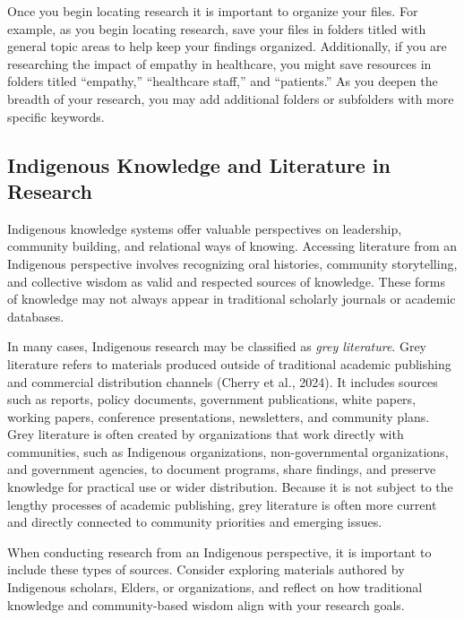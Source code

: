 \documentclass[
  letterpaper,
  DIV=11,
  numbers=noendperiod]{scrreprt}
\begin{document}
Once you begin locating research it is important to organize your files.
For example, as you begin locating research, save your files in folders
titled with general topic areas to help keep your findings organized.
Additionally, if you are researching the impact of empathy in
healthcare, you might save resources in folders titled ``empathy,''
``healthcare staff,'' and ``patients.'' As you deepen the breadth of
your research, you may add additional folders or subfolders with more
specific keywords.

\subsection*{Indigenous Knowledge and Literature in
Research}\label{indigenous-knowledge-and-literature-in-research}

Indigenous knowledge systems offer valuable perspectives on leadership,
community building, and relational ways of knowing. Accessing literature
from an Indigenous perspective involves recognizing oral histories,
community storytelling, and collective wisdom as valid and respected
sources of knowledge. These forms of knowledge may not always appear in
traditional scholarly journals or academic databases.

In many cases, Indigenous research may be classified as \emph{grey
literature}. Grey literature refers to materials produced outside of
traditional academic publishing and commercial distribution channels
(Cherry et al., 2024). It includes sources such as reports, policy
documents, government publications, white papers, working papers,
conference presentations, newsletters, and community plans. Grey
literature is often created by organizations that work directly with
communities, such as Indigenous organizations, non-governmental
organizations, and government agencies, to document programs, share
findings, and preserve knowledge for practical use or wider
distribution. Because it is not subject to the lengthy processes of
academic publishing, grey literature is often more current and directly
connected to community priorities and emerging issues.

When conducting research from an Indigenous perspective, it is important
to include these types of sources. Consider exploring materials authored
by Indigenous scholars, Elders, or organizations, and reflect on how
traditional knowledge and community-based wisdom align with your
research goals.
\end{document}
